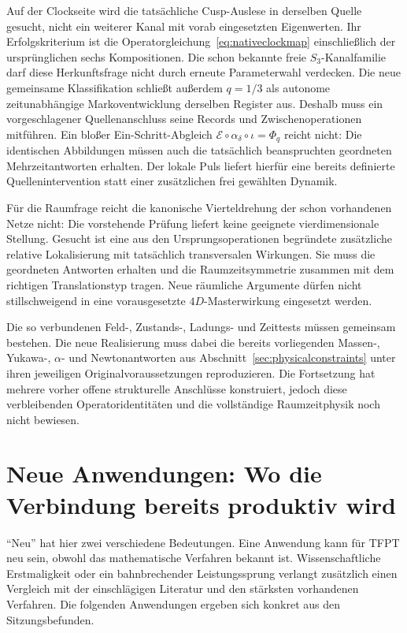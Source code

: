 Auf der Clockseite wird die tatsächliche Cusp-Auslese in derselben Quelle gesucht, nicht ein weiterer Kanal mit vorab eingesetzten Eigenwerten. Ihr Erfolgskriterium ist die Operatorgleichung~\eqref{eq:nativeclockmap} einschließlich der ursprünglichen sechs Kompositionen. Die schon bekannte freie $S_3$-Kanalfamilie darf diese Herkunftsfrage nicht durch erneute Parameterwahl verdecken. Die neue gemeinsame Klassifikation schließt außerdem $q=1/3$ als autonome zeitunabhängige Markoventwicklung derselben Register aus. Deshalb muss ein vorgeschlagener Quellenanschluss seine Records und Zwischenoperationen mitführen. Ein bloßer Ein-Schritt-Abgleich $\mathcal E\circ\alpha_\delta\circ\iota=\Phi_q$ reicht nicht: Die identischen Abbildungen müssen auch die tatsächlich beanspruchten geordneten Mehrzeitantworten erhalten. Der lokale Puls liefert hierfür eine bereits definierte Quellenintervention statt einer zusätzlichen frei gewählten Dynamik.

Für die Raumfrage reicht die kanonische Vierteldrehung der schon vorhandenen Netze nicht: Die vorstehende Prüfung liefert keine geeignete vierdimensionale Stellung. Gesucht ist eine aus den Ursprungsoperationen begründete zusätzliche relative Lokalisierung mit tatsächlich transversalen Wirkungen. Sie muss die geordneten Antworten erhalten und die Raumzeitsymmetrie zusammen mit dem richtigen Translationstyp tragen. Neue räumliche Argumente dürfen nicht stillschweigend in eine vorausgesetzte $4D$-Masterwirkung eingesetzt werden.

Die so verbundenen Feld-, Zustands-, Ladungs- und Zeittests müssen gemeinsam bestehen. Die neue Realisierung muss dabei die bereits vorliegenden Massen-, Yukawa-, $\alpha$- und Newtonantworten aus Abschnitt~\ref{sec:physicalconstraints} unter ihren jeweiligen Originalvoraussetzungen reproduzieren. Die Fortsetzung hat mehrere vorher offene strukturelle Anschlüsse konstruiert, jedoch diese verbleibenden Operatoridentitäten und die vollständige Raumzeitphysik noch nicht bewiesen.

\section{Neue Anwendungen: Wo die Verbindung bereits produktiv wird}

``Neu'' hat hier zwei verschiedene Bedeutungen. Eine Anwendung kann für TFPT neu sein, obwohl das mathematische Verfahren bekannt ist. Wissenschaftliche Erstmaligkeit oder ein bahnbrechender Leistungssprung verlangt zusätzlich einen Vergleich mit der einschlägigen Literatur und den stärksten vorhandenen Verfahren. Die folgenden Anwendungen ergeben sich konkret aus den Sitzungsbefunden.

